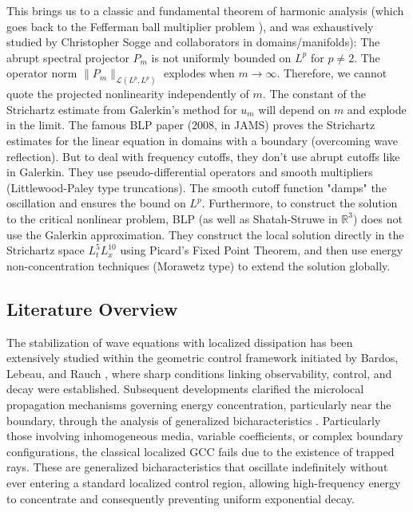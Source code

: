\documentclass[11pt,letterpaper]{amsart}
\begin{document}
This brings us to a classic and fundamental theorem of harmonic analysis (which goes back to the Fefferman ball multiplier problem \cite{Fefferman}), and was exhaustively studied by Christopher Sogge  and collaborators in domains/manifolds): The abrupt spectral projector $P_m$ is not uniformly bounded on $L^p$ for $p \neq 2$. The operator norm $\|P_m\|_{\mathcal{L}(L^p, L^p)}$ explodes when $m \to \infty$. Therefore, we cannot quote the projected nonlinearity independently of $m$. The constant of the Strichartz estimate from Galerkin's method for $u_m$ will depend on $m$ and explode in the limit. The famous BLP paper (2008, in JAMS) proves the Strichartz estimates for the linear equation in domains with a boundary (overcoming wave reflection). But to deal with frequency cutoffs, they don't use abrupt cutoffs like in Galerkin. They use pseudo-differential operators and smooth multipliers (Littlewood-Paley type truncations). The smooth cutoff function "damps" the oscillation and ensures the bound on $L^p$. Furthermore, to construct the solution to the critical nonlinear problem, BLP (as well as Shatah-Struwe in $\mathbb{R}^3$) does not use the Galerkin approximation. They construct the local solution directly in the Strichartz space $L^5_t L^{10}_x$ using Picard's Fixed Point Theorem, and then use energy non-concentration techniques (Morawetz type) to extend the solution globally.

\subsection{Literature Overview}

The stabilization of wave equations with localized dissipation has been
extensively studied within the geometric control framework initiated by
Bardos, Lebeau, and Rauch \cite{BLR}, where sharp conditions linking
observability, control, and decay were established. Subsequent developments
clarified the microlocal propagation mechanisms governing energy concentration,
particularly near the boundary, through the analysis of generalized
bicharacteristics \cite{ Burq-Gerard,Lebeau-Robbiano,Littman-Betelu,Melrose,Melrose-Sjostrand,Melrose-Sjostrand2,Lebeau}.
Particularly those involving inhomogeneous media, variable
coefficients, or complex boundary configurations, the classical localized GCC fails due to
the existence of trapped rays. These are generalized bicharacteristics that oscillate indefinitely
without ever entering a standard localized control region, allowing high-frequency energy to
concentrate and consequently preventing uniform exponential decay.
\end{document}
